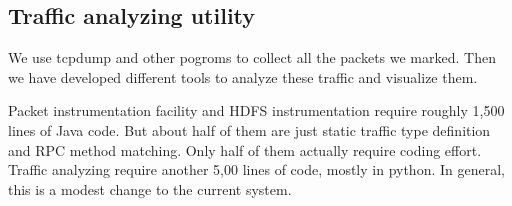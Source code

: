 \subsection{Traffic analyzing utility}
    We use tcpdump and other pogroms to collect all the packets we marked. Then we have developed different tools to analyze these traffic and visualize them. 

Packet instrumentation facility and HDFS instrumentation require roughly 1,500 lines of Java code. But about half of them are just static traffic type definition and RPC method matching. Only half of them actually require coding effort. Traffic analyzing require another 5,00 lines of code, mostly in python. In general, this is a modest change to the current system.


